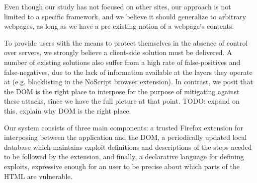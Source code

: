  Even though our study has not focused on other sites, our approach is not limited to a specific framework, and we believe it should generalize to arbitrary webpages, as long as we have a pre-existing notion of a webpage's contents.

To provide users with the means to protect themselves in the absence of control over servers, we strongly believe a client-side solution must be delivered. A number of existing solutions also suffer from a high rate of false-positives and false-negatives, due to the lack of information available at the layers they operate at (e.g. blacklisting in the NoScript browser extension). In contrast, we posit that the DOM is the right place to interpose for the purpose of mitigating against these attacks, since we have the full picture at that point. TODO: expand on this, explain why DOM is the right place.

 Our system consists of three main components: a trusted Firefox extension for interposing between the application and the DOM, a periodically updated local database which maintains exploit definitions and descriptions of the steps needed to be followed by the extension, and finally, a declarative language for defining exploits, expressive enough for an user to be precise about which parts of the HTML are vulnerable. 


